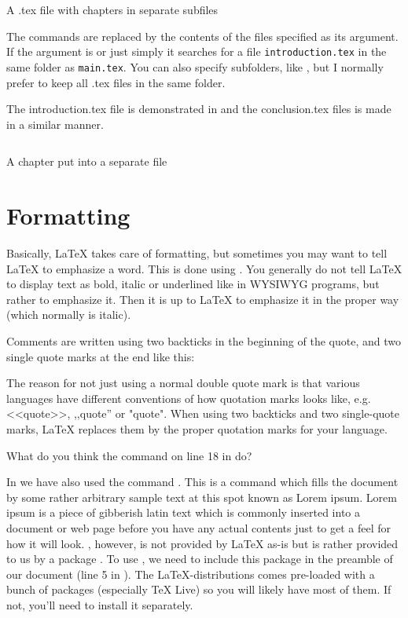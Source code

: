\begin{listing}
	\inputminted{latex}{latex/multifiles.tex}
	\caption{A .tex file with chapters in separate subfiles}
	\label{lst:latex:multifiles}
\end{listing}

The \latexin{} commands are replaced by the contents of the files specified as its argument. If the argument is  or just simply  it searches for a file \verb|introduction.tex| in the same folder as \verb|main.tex|. You can also specify subfolders, like , but I normally prefer to keep all .tex files in the same folder.

The introduction.tex file is demonstrated in  and the conclusion.tex files is made in a similar manner.

\begin{listing}
	\inputminted{latex}{latex/introduction.tex}
	\caption{A chapter put into a separate file}
	\label{lst:latex:introduction}
\end{listing}


\section{Formatting}
Basically, \LaTeX{} takes care of formatting, but sometimes you may want to tell \LaTeX{} to emphasize a word. This is done using \latexin{\emph}. You generally do not tell \LaTeX{} to display text as bold, italic or underlined like in WYSIWYG programs, but rather to emphasize it. Then it is up to \LaTeX{} to emphasize it in the proper way (which normally is italic).

Comments are written using two backticks in the beginning of the quote, and two single quote marks at the end like this:


The reason for not just using a normal double quote mark is that various languages have different conventions of how quotation marks looks like, e.g. <<quote>>, ,,quote'' or "quote". When using two backticks and two single-quote marks, \LaTeX{} replaces them by the proper quotation marks for your language.

What do you think the command \latexin{\LaTeX{}} on line 18 in  do?

In  we have also used the command \latexin{\lipsum}. This is a command which fills the document by some rather arbitrary sample text at this spot known as Lorem ipsum. Lorem ipsum is a piece of gibberish latin text which is commonly inserted into a document or web page before you have any actual contents just to get a feel for how it will look. \latexin{\lipsum}, however, is not provided by \LaTeX{} as-is but is rather provided to us by a package . To use \latexin{\lipsum}, we need to include this package in the preamble of our document (line 5 in ). The \LaTeX{}-distributions comes pre-loaded with a bunch of packages (especially TeX Live) so you will likely have most of them. If not, you'll need to install it separately.


